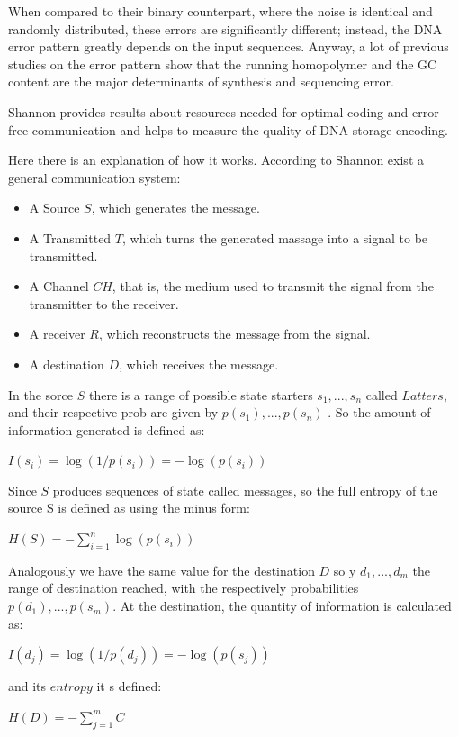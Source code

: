 \documentclass[10pt,twocolumn,twoside]{gsajnl}
\theoremstyle{definition}
\begin{document}
When compared to their binary counterpart, where the noise is identical and randomly distributed, these errors are significantly different; instead, the DNA error pattern greatly depends on the input sequences.
Anyway, a lot of previous studies on the error pattern show that the running homopolymer and the GC content are the major determinants of synthesis and sequencing error.

Shannon provides results about resources needed for optimal coding and error-free communication and helps to measure the quality of DNA storage encoding.

Here there is an explanation of how it works.
According to Shannon exist a general communication system:
\begin{itemize}
    \item A Source $S$, which generates the message.
    \item A Transmitted $T$, which turns the generated massage into a signal to be transmitted.
    \item A Channel $CH$, that is, the medium used to transmit the signal from the transmitter to the receiver.
    \item A receiver $R$, which reconstructs the message from the signal.
    \item A destination $D$, which receives the message.
\end{itemize}

In the sorce $S$ there is a range of possible state starters $s_{1},..., s_{n}$ called $Latters$, and their respective prob are given by $p(s_{1}),...,p(s_{n})$ .
So the amount of information generated is defined as:
\begin{center}
$I(s_{i}) = \log(1/p(s_{i})) = - \log(p(s_{i}))$
\end{center}
Since $S$ produces sequences of state called messages, so the full entropy of the source S is defined as using the minus form:
\begin{center}
$ H(S) = - \sum_{i = 1}^{n} \log(p(s_{i}))$
\end{center}
Analogously we have the same value for the destination $D$ so y $d_{1},..., d_{m}$ the range of destination reached, with the respectively probabilities $p(d_{1}),...,p(s_{m})$. At the destination, the quantity of information is calculated as:
\begin{center}
$I(d_{j}) = \log(1/p(d_{j})) = - \log(p(s_{j}))$
\end{center}
and its $entropy$ it s defined:
\begin{center}
$ H(D) = - \sum_{j = 1}^{m} C$
\end{center}
\end{document}
